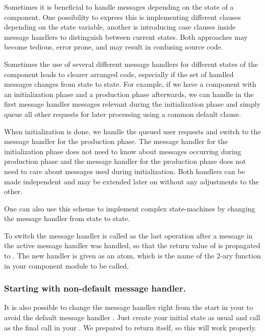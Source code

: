 Sometimes it is beneficial to handle messages depending on the state of a
component. One possibility to express this is implementing different clauses
depending on the state variable, another is introducing case clauses inside
message handlers to distinguish between current states. Both approaches may
become tedious, error prone, and may result in confusing source code.

Sometimes the use of several different message handlers for different states
of the component leads to clearer arranged code, especially if the set of
handled messages changes from state to state. For example, if we have a
component with an initialization phase and a production phase afterwards, we
can handle in the first message handler messages relevant during the
initialization phase and simply queue all other requests for later
processing using a common default clause.

When initialization is done, we handle the queued user requests and switch
to the message handler for the production phase. The message handler for the
initialization phase does not need to know about messages occurring during
production phase and the message handler for the production phase does not
need to care about messages used during initialization. Both handlers can be
made independent and may be extended later on without any adjustments to the
other.

One can also use this scheme to implement complex state-machines by changing
the message handler from state to state.

To switch the message handler
 is called as
the last operation after a message in the active message handler was
handled, so that the return value of
 is propagated to
.  The new handler is given as an atom, which is
the name of the 2-ary function in your component module to be called.

\subsubsection{Starting with non-default message handler.}
It is also possible to change the message handler right from the start
in your  to avoid the default message
handler . Just create your initial
state as usual and call  as the final call in your
. We prepared
 to return  itself,
so this will work properly.

